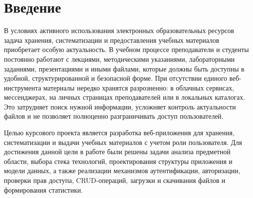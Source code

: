 \documentclass[14pt,a4paper]{extarticle}
\begin{document}
\sloppy

\setlength{\tabcolsep}{5pt}
\renewcommand{\arraystretch}{1.15}


\section*{Введение}

В условиях активного использования электронных образовательных ресурсов задача хранения, систематизации и предоставления учебных материалов приобретает особую актуальность. В учебном процессе преподаватели и студенты постоянно работают с лекциями, методическими указаниями, лабораторными заданиями, презентациями и иными файлами, которые должны быть доступны в удобной, структурированной и безопасной форме. При отсутствии единого веб-инструмента материалы нередко хранятся разрозненно: в облачных сервисах, мессенджерах, на личных страницах преподавателей или в локальных каталогах. Это затрудняет поиск нужной информации, усложняет контроль актуальности файлов и не позволяет полноценно разграничивать доступ пользователей.

Целью курсового проекта является разработка веб-приложения для хранения, систематизации и выдачи учебных материалов с учетом роли пользователя. Для достижения данной цели в работе были решены задачи анализа предметной области, выбора стека технологий, проектирования структуры приложения и модели данных, а также реализации механизмов аутентификации, авторизации, проверки прав доступа, CRUD-операций, загрузки и скачивания файлов и формирования статистики.
\end{document}
